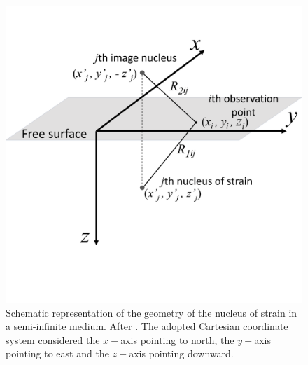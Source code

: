 \documentclass[P]{BrJG_submit}
\begin{document}
\begin{figure}[t]
    \centering
    \includegraphics[scale=0.90]{figures/Figure_Nucleus_Strain.png}
    \vspace{-2.5cm} 
    \caption{Schematic representation of the geometry of the nucleus of strain in a semi-infinite medium. 
    After \cite{Munoz-Roehl17}. 
	The adopted Cartesian coordinate system considered the $x-$axis pointing to north, the $y-$axis pointing 
	to east and the $z-$axis pointing downward.}
	\label{fig:nucleus_strain}
\end{figure}

\end{document}
